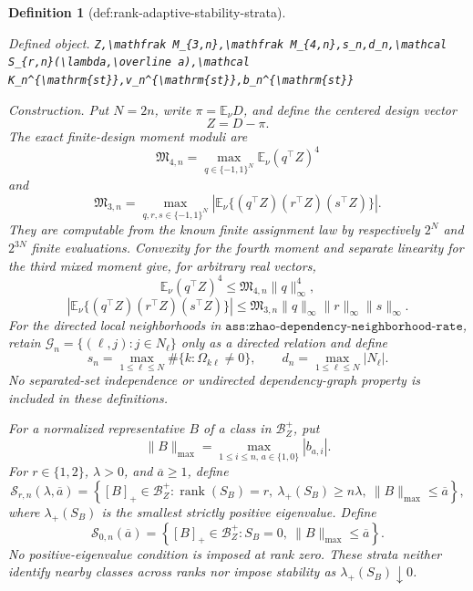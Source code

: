 \documentclass{article}
\newtheorem{definition}{Definition}
\begin{document}
\begin{definition}[def:rank-adaptive-stability-strata]\label{def:rank-adaptive-stability-strata}
\par\smallskip\noindent\emph{Defined object.} \texttt{Z,\allowbreak{}\textbackslash{}\allowbreak{}mathfrak M\_\allowbreak{}\{3,\allowbreak{}n\}\allowbreak{},\allowbreak{}\textbackslash{}\allowbreak{}mathfrak M\_\allowbreak{}\{4,\allowbreak{}n\}\allowbreak{},\allowbreak{}s\_\allowbreak{}n,\allowbreak{}d\_\allowbreak{}n,\allowbreak{}\textbackslash{}\allowbreak{}mathcal S\_\allowbreak{}\{r,\allowbreak{}n\}\allowbreak{}(\textbackslash{}\allowbreak{}lambda,\allowbreak{}\textbackslash{}\allowbreak{}overline a),\allowbreak{}\textbackslash{}\allowbreak{}mathcal K\_\allowbreak{}n\textasciicircum{}\{\textbackslash{}\allowbreak{}mathrm\{st\}\allowbreak{}\}\allowbreak{},\allowbreak{}v\_\allowbreak{}n\textasciicircum{}\{\textbackslash{}\allowbreak{}mathrm\{st\}\allowbreak{}\}\allowbreak{},\allowbreak{}b\_\allowbreak{}n\textasciicircum{}\{\textbackslash{}\allowbreak{}mathrm\{st\}\allowbreak{}\}\allowbreak{}}
\par\smallskip\noindent\emph{Construction.} Put \(N=2n\), write \(\pi=\mathbb E_\nu D\), and define the centered design vector
\[
Z=D-\pi.
\]
The exact finite-design moment moduli are
\[
\mathfrak M_{4,n}
=\max_{q\in\{-1,1\}^{N}}\mathbb E_\nu(q^{\top}Z)^4
\]
and
\[
\mathfrak M_{3,n}
=\max_{q,r,s\in\{-1,1\}^{N}}
\left|\mathbb E_\nu\{(q^{\top}Z)(r^{\top}Z)(s^{\top}Z)\}\right|.
\]
They are computable from the known finite assignment law by respectively \(2^N\) and \(2^{3N}\) finite evaluations.  Convexity for the fourth moment and separate linearity for the third mixed moment give, for arbitrary real vectors,
\[
\mathbb E_\nu(q^{\top}Z)^4
\le\mathfrak M_{4,n}\lVert q\rVert_\infty^4,
\]
\[
\left|\mathbb E_\nu\{(q^{\top}Z)(r^{\top}Z)(s^{\top}Z)\}\right|
\le\mathfrak M_{3,n}\lVert q\rVert_\infty
\lVert r\rVert_\infty\lVert s\rVert_\infty.
\]
For the directed local neighborhoods in \(\texttt{ass:zhao-dependency-neighborhood-rate}\), retain \(\mathcal G_n=\{(\ell,j):j\in N_\ell\}\) only as a directed relation and define
\[
s_n=\max_{1\le \ell\le N}\#\{k:\Omega_{k\ell}\ne0\},
\qquad
d_n=\max_{1\le \ell\le N}\lvert N_\ell\rvert.
\]
No separated-set independence or undirected dependency-graph property is included in these definitions.

For a normalized representative \(B\) of a class in \(\mathcal B_Z^+\), put
\[
\lVert B\rVert_{\max}
=\max_{1\le i\le n,\,a\in\{1,0\}}|b_{a,i}|.
\]
For \(r\in\{1,2\}\), \(\lambda>0\), and \(\overline a\ge1\), define
\[
\mathcal S_{r,n}(\lambda,\overline a)
=\left\{[B]_+\in\mathcal B_Z^+:
\operatorname{rank}(S_B)=r,\ 
\lambda_+(S_B)\ge n\lambda,\ 
\lVert B\rVert_{\max}\le\overline a\right\},
\]
where \(\lambda_+(S_B)\) is the smallest strictly positive eigenvalue.  Define
\[
\mathcal S_{0,n}(\overline a)
=\left\{[B]_+\in\mathcal B_Z^+:S_B=0,\ 
\lVert B\rVert_{\max}\le\overline a\right\}.
\]
No positive-eigenvalue condition is imposed at rank zero.  These strata neither identify nearby classes across ranks nor impose stability as \(\lambda_+(S_B)\downarrow0\).


\end{definition}
\end{document}
